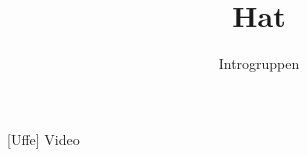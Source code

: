 \documentclass[danish]{article}
\title{Hat}
\author{Introgruppen}
\begin{document}
\maketitle

\begin{roles}
 [Uffe] Video
\end {roles} 
\end{document}

